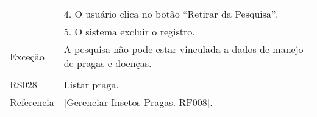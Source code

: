 \begin{table}[!h]
\begin{tabular}{|l|l|}
                                                         & 4. O usuário clica no botão “Retirar da Pesquisa”.                                                                                                                                                                                                                                                                                                                                       \\ \cline{2-2} 
                                                         & 5. O sistema excluir o registro.                                                                                                                                                                                                                                                                                                                                                         \\ \hline
Exceção                                                  & A pesquisa não pode estar vinculada a dados de manejo de pragas e doenças.                                                                                                                                                                                                                                                                                                               \\ \hline
                                                         &                                                                                                                                                                                                                                                                                                                                                                                          \\ \hline
RS028                                                    & Listar praga.                                                                                                                                                                                                                                                                                                                                                                            \\ \hline
Referencia                                               & {[}Gerenciar Insetos Pragas. RF008{]}.                                                                                                                                                                                                                                                                                                                                                   \\ \hline

\end{tabular}
\end{table}
